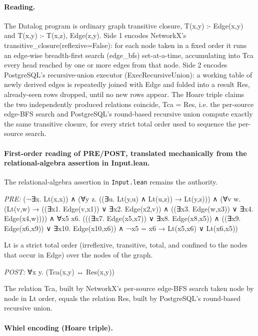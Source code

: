 \documentclass[10pt]{article}
\begin{document}
\paragraph{Reading.} The Datalog program is ordinary graph transitive closure, T(x,y) :- Edge(x,y) and T(x,y) :- T(x,z), Edge(z,y). Side 1 encodes NetworkX's transitive\_closure(reflexive=False): for each node taken in a fixed order it runs an edge-wise breadth-first search (edge\_bfs) set-at-a-time, accumulating into Tca every head reached by one or more edges from that node. Side 2 encodes PostgreSQL's recursive-union executor (ExecRecursiveUnion): a working table of newly derived edges is repeatedly joined with Edge and folded into a result Res, already-seen rows dropped, until no new rows appear. The Hoare triple claims the two independently produced relations coincide, Tca = Res, i.e. the per-source edge-BFS search and PostgreSQL's round-based recursive union compute exactly the same transitive closure, for every strict total order used to sequence the per-source search.

\paragraph{First-order reading of PRE/POST, translated mechanically from the relational-algebra assertion in Input.lean.} The relational-algebra assertion in \texttt{Input.lean} remains the authority.

\textit{PRE:} (¬∃x. Lt(x,x)) ∧ (∀y z. ((∃u. Lt(y,u) ∧ Lt(u,z)) → Lt(y,z))) ∧ (∀v w. (Lt(v,w) → ((∃x1. Edge(v,x1)) ∨ ∃x2. Edge(x2,v)) ∧ ((∃x3. Edge(w,x3)) ∨ ∃x4. Edge(x4,w)))) ∧ ∀x5 x6. (((∃x7. Edge(x5,x7)) ∨ ∃x8. Edge(x8,x5)) ∧ ((∃x9. Edge(x6,x9)) ∨ ∃x10. Edge(x10,x6)) ∧ ¬x5 = x6 → Lt(x5,x6) ∨ Lt(x6,x5))\par Lt is a strict total order (irreflexive, transitive, total, and confined to the nodes that occur in Edge) over the nodes of the graph.

\textit{POST:} ∀x y. (Tca(x,y) ↔ Res(x,y))\par The relation Tca, built by NetworkX's per-source edge-BFS search taken node by node in Lt order, equals the relation Res, built by PostgreSQL's round-based recursive union.

\paragraph{Whiel encoding (Hoare triple).}
\end{document}
